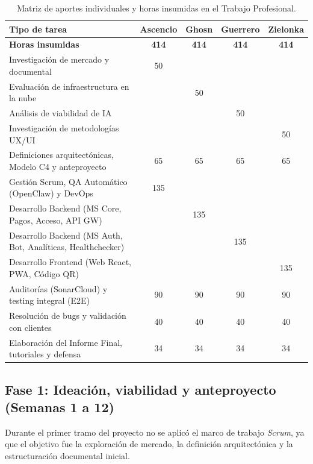 \begin{table}[htbp]
    \centering
    \small
    \renewcommand{\arraystretch}{1.3}
    \begin{tabular}{|p{5cm}|c|c|c|c|}
    \hline
    \textbf{Tipo de tarea} & \textbf{Ascencio} & \textbf{Ghosn} & \textbf{Guerrero} & \textbf{Zielonka} \\ \hline
    \textbf{Horas insumidas} & \textbf{414} & \textbf{414} & \textbf{414} & \textbf{414} \\ \hline
    Investigación de mercado y documental & 50 & & & \\ \hline
    Evaluación de infraestructura en la nube & & 50 & & \\ \hline
    Análisis de viabilidad de IA & & & 50 & \\ \hline
    Investigación de metodologías UX/UI & & & & 50 \\ \hline
    Definiciones arquitectónicas, Modelo C4 y anteproyecto & 65 & 65 & 65 & 65 \\ \hline
    Gestión Scrum, QA Automático (OpenClaw) y DevOps & 135 & & & \\ \hline
    Desarrollo Backend (MS Core, Pagos, Acceso, API GW) & & 135 & & \\ \hline
    Desarrollo Backend (MS Auth, Bot, Analíticas, Healthchecker)& & & 135 & \\ \hline
    Desarrollo Frontend (Web React, PWA, Código QR) & & & & 135 \\ \hline
    Auditorías (SonarCloud) y testing integral (E2E) & 90 & 90 & 90 & 90 \\ \hline
    Resolución de bugs y validación con clientes & 40 & 40 & 40 & 40 \\ \hline
    Elaboración del Informe Final, tutoriales y defensa & 34 & 34 & 34 & 34 \\ \hline
    \end{tabular}
    \caption{Matriz de aportes individuales y horas insumidas en el Trabajo Profesional.}
    \label{tab:aportes_individuales}
\end{table}

\newpage

\subsection{Fase 1: Ideación, viabilidad y anteproyecto (Semanas 1 a 12)}

Durante el primer tramo del proyecto no se aplicó el marco de trabajo \textit{Scrum}, ya que el objetivo fue la exploración de mercado, la definición arquitectónica y la estructuración documental inicial.

